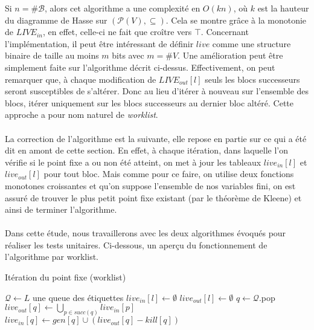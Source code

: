 \documentclass[a4paper, 12pt]{article}
\begin{document}
Si $n = \#\mathcal{B}$, alors cet algorithme a une complexité en $O(kn)$, où $k$ est la hauteur du diagramme
de Hasse sur $(\mathcal{P}(V), \subseteq)$. Cela se montre grâce à la monotonie de $LIVE_{in}$, en effet,
celle-ci ne fait que croître vers $\top$.
Concernant l'implémentation, il peut être intéressant de définir $live$ comme une structure binaire de taille au
moins $m$ bits avec $m = \#V$.
Une amélioration peut être simplement faite sur l'algorithme décrit ci-dessus. Effectivement, on peut remarquer que,
à chaque modification de $LIVE_{out}[l]$ seuls les blocs successeurs seront susceptibles de s'altérer. Donc
au lieu d'itérer à nouveau sur l'ensemble des blocs, itérer uniquement sur les blocs successeurs au dernier
bloc altéré. Cette approche a pour nom naturel de \textit{worklist}.
\\
\\
La correction de l'algorithme est la suivante, elle repose en partie sur ce qui a été dit en amont de cette section.
En effet, à chaque itération, dans laquelle l'on vérifie si le point fixe a ou non été atteint, on met à jour les
tableaux $live_{in}[l]$ et $live_{out}[l]$ pour tout bloc. Mais comme pour ce faire, on utilise deux fonctions monotones croissantes et qu'on suppose
l'ensemble de nos variables fini, on est assuré de trouver le plus petit point fixe existant (par le théorème de Kleene) et ainsi de terminer l'algorithme.
\\
\\
Dans cette étude, nous travaillerons avec les deux algorithmes évoqués pour réaliser les tests unitaires. Ci-dessous, un aperçu du fonctionnement
de l'algorithme par worklist.

\begin{algorithm}
	\caption{Itération du point fixe (worklist)}
	\begin{algorithmic}
		\State $\mathcal{Q} \leftarrow L$ une queue des étiquettes
		\State $live_{in}[l] \leftarrow \emptyset$
		\State $live_{out}[l] \leftarrow \emptyset$
		\EndFor
		\State $q \leftarrow \mathcal{Q}$.pop
		\State $live_{out}[q] \leftarrow \bigcup\limits_{p\in succ(q)} live_{in}[p]$
		\State $live_{in}[q] \leftarrow gen[q] \cup (live_{out}[q] - kill[q])$
		\EndWhile
	\end{algorithmic}
\end{algorithm}
\end{document}
